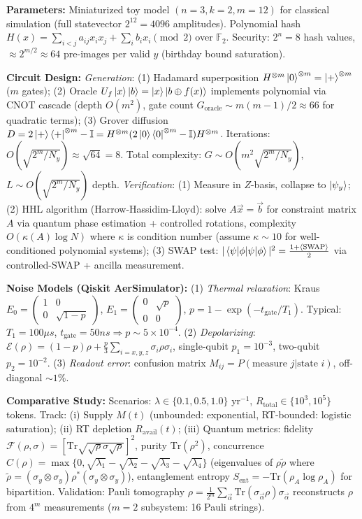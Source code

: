 \documentclass[a4paper,11pt,twoside]{article}
\begin{document}
\textbf{Parameters:} Miniaturized toy model $(n=3, k=2, m=12)$ for classical simulation (full statevector $2^{12} = 4096$ amplitudes). Polynomial hash $H(x) = \sum_{i<j} a_{ij}x_ix_j + \sum_i b_i x_i \pmod{2}$ over $\mathbb{F}_2$. Security: $2^n = 8$ hash values, $\approx 2^{m/2} \approx 64$ pre-images per valid $y$ (birthday bound saturation).

\textbf{Circuit Design:} \textit{Generation}: (1) Hadamard superposition $H^{\otimes m}\ket{0}^{\otimes m} = \ket{+}^{\otimes m}$ ($m$ gates); (2) Oracle $U_f\ket{x}\ket{b} = \ket{x}\ket{b \oplus f(x)}$ implements polynomial via CNOT cascade (depth $O(m^2)$, gate count $G_{\text{oracle}} \sim m(m-1)/2 \approx 66$ for quadratic terms); (3) Grover diffusion $D = 2\ket{+}\bra{+}^{\otimes m} - \mathbb{I} = H^{\otimes m}(2\ket{0}\bra{0}^{\otimes m} - \mathbb{I})H^{\otimes m}$. Iterations: $O(\sqrt{2^m/N_y}) \approx \sqrt{64} = 8$. Total complexity: $G \sim O(m^2\sqrt{2^m/N_y})$, $L \sim O(\sqrt{2^m/N_y})$ depth. \textit{Verification}: (1) Measure in $Z$-basis, collapse to $\ket{\psi_y}$; (2) HHL algorithm (Harrow-Hassidim-Lloyd): solve $A\vec{x} = \vec{b}$ for constraint matrix $A$ via quantum phase estimation + controlled rotations, complexity $O(\kappa(A)\log N)$ where $\kappa$ is condition number (assume $\kappa \sim 10$ for well-conditioned polynomial systems); (3) SWAP test: $|\braket{\psi|\phi}|^2 = \frac{1 + \langle\text{SWAP}\rangle}{2}$ via controlled-SWAP + ancilla measurement.

\textbf{Noise Models (Qiskit AerSimulator):} (1) \textit{Thermal relaxation}: Kraus $E_0 = \begin{pmatrix}1 & 0\\0 & \sqrt{1-p}\end{pmatrix}$, $E_1 = \begin{pmatrix}0 & \sqrt{p}\\0 & 0\end{pmatrix}$, $p = 1-\exp(-t_{\text{gate}}/T_1)$. Typical: $T_1 = 100\mu s$, $t_{\text{gate}} = 50ns \Rightarrow p \sim 5\times10^{-4}$. (2) \textit{Depolarizing}: $\mathcal{E}(\rho) = (1-p)\rho + \frac{p}{3}\sum_{i=x,y,z}\sigma_i\rho\sigma_i$, single-qubit $p_1 = 10^{-3}$, two-qubit $p_2 = 10^{-2}$. (3) \textit{Readout error}: confusion matrix $M_{ij} = P(\text{measure } j|\text{state } i)$, off-diagonal $\sim 1\%$.

\textbf{Comparative Study:} Scenarios: $\lambda \in \{0.1, 0.5, 1.0\}$ yr$^{-1}$, $R_{\text{total}} \in \{10^3, 10^5\}$ tokens. Track: (i) Supply $M(t)$ (unbounded: exponential, RT-bounded: logistic saturation); (ii) RT depletion $R_{\text{avail}}(t)$; (iii) Quantum metrics: fidelity $\mathcal{F}(\rho,\sigma) = [\text{Tr}\sqrt{\sqrt{\rho}\sigma\sqrt{\rho}}]^2$, purity $\text{Tr}(\rho^2)$, concurrence $C(\rho) = \max\{0, \sqrt{\lambda_1} - \sqrt{\lambda_2} - \sqrt{\lambda_3} - \sqrt{\lambda_4}\}$ (eigenvalues of $\rho\tilde{\rho}$ where $\tilde{\rho} = (\sigma_y\otimes\sigma_y)\rho^*(\sigma_y\otimes\sigma_y)$), entanglement entropy $S_{\text{ent}} = -\text{Tr}(\rho_A\log\rho_A)$ for bipartition. Validation: Pauli tomography $\rho = \frac{1}{2^m}\sum_{\vec{\alpha}} \text{Tr}(\sigma_{\vec{\alpha}}\rho)\sigma_{\vec{\alpha}}$ reconstructs $\rho$ from $4^m$ measurements ($m=2$ subsystem: 16 Pauli strings).
\end{document}
